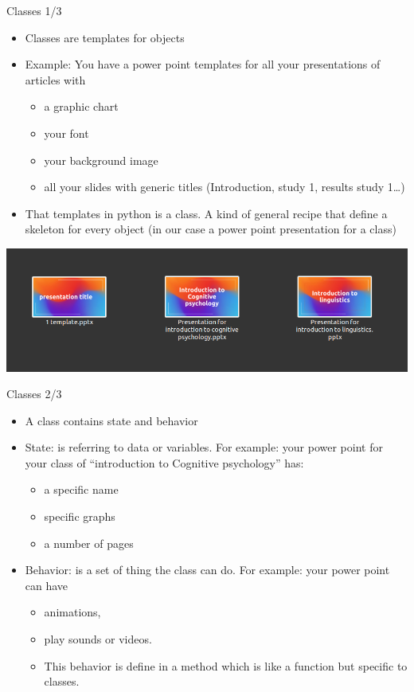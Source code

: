 \documentclass[
  8pt,
  ignorenonframetext,
]{beamer}
\providecommand{\tightlist}{%
  \setlength{\itemsep}{0pt}\setlength{\parskip}{0pt}}
\begin{document}
\begin{frame}{Classes 1/3}
\protect\hypertarget{classes-13}{}
\begin{itemize}
\item
  Classes are templates for objects
\item
  Example: You have a power point templates for all your presentations
  of articles with

  \begin{itemize}
  \tightlist
  \item
    a graphic chart
  \item
    your font
  \item
    your background image
  \item
    all your slides with generic titles (Introduction, study 1, results
    study 1\ldots)
  \end{itemize}
\item
  That templates in python is a class. A kind of general recipe that
  define a skeleton for every object (in our case a power point
  presentation for a class)
\end{itemize}

\includegraphics{class object.png}
\end{frame}

\begin{frame}{Classes 2/3}
\protect\hypertarget{classes-23}{}
\begin{itemize}
\item
  A class contains state and behavior
\item
  State: is referring to data or variables. For example: your power
  point for your class of ``introduction to Cognitive psychology'' has:

  \begin{itemize}
  \tightlist
  \item
    a specific name
  \item
    specific graphs
  \item
    a number of pages
  \end{itemize}
\item
  Behavior: is a set of thing the class can do. For example: your power
  point can have

  \begin{itemize}
  \tightlist
  \item
    animations,
  \item
    play sounds or videos.
  \item
    This behavior is define in a method which is like a function but
    specific to classes.
  \end{itemize}
\end{itemize}
\end{frame}
\end{document}
